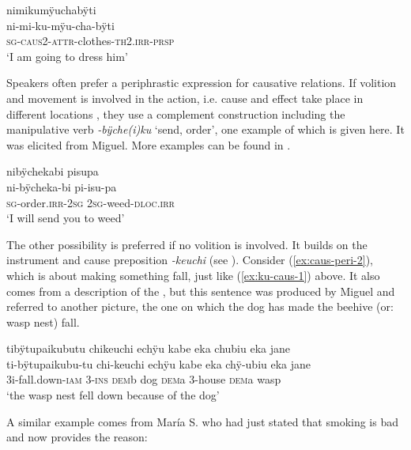 \ea\label{ex:attr-caus}
\begingl
\glpreamble nimikumÿuchabÿti\\
\gla ni-mi-ku-mÿu-cha-bÿti\\
\textsc{sg}-\textsc{caus}2-\textsc{attr}-clothes-\textsc{th}2\textsc{.irr}-\textsc{prsp}\\
\glft ‘I am going to dress him’
\endgl
\trailingcitation{[jxx-e150925l-1.101]}%
\xe{}

Speakers often prefer a periphrastic expression for causative relations. If volition and movement is involved in the action, i.e. cause and effect take place in different locations \citep[cf.][182]{Payne1997}, they use a complement construction including the manipulative verb \textit{-bÿche(i)ku} ‘send, order’, one example of which is given here. It was elicited from Miguel. More examples can be found in .

\ea\label{ex:caus-peri-1}
\begingl
\glpreamble nibÿchekabi pisupa\\
\gla ni-bÿcheka-bi pi-isu-pa\\
\textsc{sg}-order.\textsc{irr}-2\textsc{sg} 2\textsc{sg}-weed-\textsc{dloc.irr}\\
\glft ‘I will send you to weed’
\endgl
\trailingcitation{[mxx-e160811sd.298]}
\xe
{}

The other possibility is preferred if no volition is involved. It builds on the instrument and cause preposition \textit{-keuchi} (see ). Consider (\ref{ex:caus-peri-2}), which is about making something fall, just like (\ref{ex:ku-caus-1}) above. It also comes from a description of the , but this sentence was produced by Miguel and referred to another picture, the one on which the dog has made the beehive (or: wasp nest) fall.

\ea\label{ex:caus-peri-2}
\begingl
\glpreamble tibÿtupaikubutu chikeuchi echÿu kabe eka chubiu eka jane\\
\gla ti-bÿtupaikubu-tu chi-keuchi echÿu kabe eka chÿ-ubiu eka jane\\
\glb 3i-fall.down-\textsc{iam} 3-\textsc{ins} \textsc{dem}b dog \textsc{dem}a 3-house \textsc{dem}a wasp\\
\glft ‘the wasp nest fell down because of the dog’
\endgl
\trailingcitation{[mox-a110920l-2.091]}
\xe

A similar example comes from María S. who had just stated that smoking is bad and now provides the reason:

